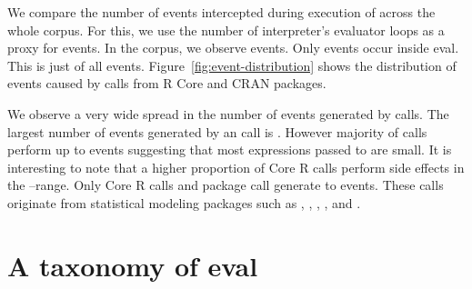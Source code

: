 \documentclass[conference]{IEEEtran}
\begin{document}
We compare the number of events intercepted during execution of \eval across the
whole corpus. For this, we use the number of interpreter's evaluator loops as a
proxy for events. In the corpus, we observe \AllEventCountRnd events. Only
\EvalEventCountRnd events occur inside eval. This is just \EvalEventAllPerc of
all events. Figure~\ref{fig:event-distribution} shows the distribution of events
caused by \eval calls from R Core and CRAN packages.

\begin{table}[ht] \label{table:event-distribution}
\caption{Distribution of events in \eval calls across Core and Package}
\end{table}

We observe a very wide spread in the number of events generated by \eval
calls. The largest number of events generated by an \eval call is \EventsMaxCount.
However majority of \eval calls perform up to \EventsMaxRangeA events suggesting
that most expressions passed to \eval are small.
It is interesting to note that a higher proportion of Core R \eval calls perform
side effects in the \EventsMinRangeB--\EventsMaxRangeB range.
Only \EventsCoreEvalCountC Core R \eval calls and \EventsPackageEvalCountC
package \eval call generate \EventsMinRangeC to \EventsMaxRangeC events.
These \eval calls originate from statistical modeling packages such as \mlogit,
\mboost, \metafor, \lavaan, \mclust and \gamlss.

\section{A taxonomy of eval}
\end{document}

